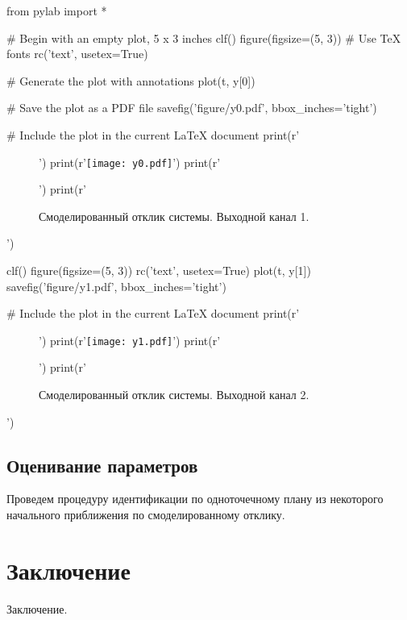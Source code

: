 \documentclass[a4paper,14pt]{extarticle}
\begin{document}
\begin{pycode}
from pylab import *

# Begin with an empty plot, 5 x 3 inches
clf()
figure(figsize=(5, 3))
# Use TeX fonts
rc('text', usetex=True)

# Generate the plot with annotations
plot(t, y[0])

# Save the plot as a PDF file
savefig('figure/y0.pdf', bbox_inches='tight')

# Include the plot in the current LaTeX document
print(r'\begin{figure}[H]')
print(r'\texttt{[image: y0.pdf]}')
print(r'\caption{Смоделированный отклик системы. Выходной канал 1.}')
print(r'\end{figure}')

clf()
figure(figsize=(5, 3))
rc('text', usetex=True)
plot(t, y[1])
savefig('figure/y1.pdf', bbox_inches='tight')

# Include the plot in the current LaTeX document
print(r'\begin{figure}[H]')
print(r'\texttt{[image: y1.pdf]}')
print(r'\caption{Смоделированный отклик системы. Выходной канал 2.}')
print(r'\end{figure}')

\end{pycode}
\renewcommand{\baselinestretch}{1.5}

\subsection{Оценивание параметров}

Проведем процедуру идентификации по одноточечному плану из некоторого
начального приближения по смоделированному отклику.

\section*{Заключение}

Заключение.
\end{document}
